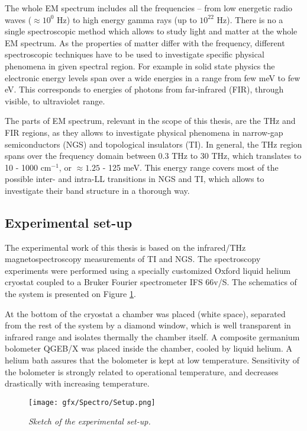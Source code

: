 \documentclass[titlepage,a4paper]{book}
\newcommand{\wciecie}{\quad\phantom{v}}
\begin{document}
The whole EM spectrum includes all the frequencies -- from low energetic radio waves ($\approx 10^0$ Hz) to high energy gamma rays (up to $10^{22}$ Hz). There is no a single spectroscopic method which allows to study light and matter at the whole EM spectrum. As the properties of matter differ with the frequency, different spectroscopic techniques have to be used to investigate specific physical phenomena in given spectral region. For example in solid state physics the electronic energy levels span over a wide energies in a range from few meV   to few eV. This corresponds to energies of photons from far-infrared (FIR), through visible, to ultraviolet range.

The parts of EM spectrum, relevant in the scope of this thesis, are the THz and FIR regions, as they allows to investigate physical phenomena in narrow-gap semiconductors (NGS) and topological insulators (TI). In general, the THz region spans over the frequency domain between 0.3 THz to 30 THz, which translates to 10 - 1000 cm$^{-1}$, or $\approx 1.25$ - 125 meV. This energy range covers most of the possible inter- and intra-LL transitions in NGS and TI, which allows to investigate their band structure in a thorough way.  

\subsection{Experimental set-up}
\wciecie
The experimental work of this thesis is based on the infrared/THz magnetospectroscopy measurements of TI and NGS. The spectroscopy experiments were performed using a specially customized Oxford liquid helium cryostat coupled to a Bruker Fourier spectrometer IFS 66v/S. The schematics of the system is presented on Figure \ref{fig:Experimental_setup}. 

At the bottom of the cryostat a chamber was placed (white space), separated from the rest of the system by a diamond window, which is well transparent in infrared range and isolates thermally the chamber itself. A composite germanium bolometer QGEB/X was placed inside the chamber, cooled by liquid helium. A helium bath assures that the bolometer is kept at low temperature. Sensitivity of the bolometer is strongly related to operational temperature, and decreases drastically with increasing temperature. 

\begin{figure}[ht]
	\centering
	\texttt{[image: gfx/Spectro/Setup.png]}
	\vspace{-10pt}
	\caption{\textit{Sketch of the experimental set-up.}}
	\label{fig:Experimental_setup}
\end{figure}
\end{document}
